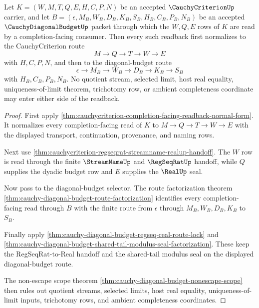 \begin{theorem}
\label{thm:cauchycriterion-diagonal-budget-readback-compatibility}
Let $K=(W,M,T,Q,E,H,C,P,N)$ be an accepted $\CauchyCriterionUp$
carrier, and let
$B=(\epsilon,M_B,W_B,D_B,K_B,S_B,H_B,C_B,P_B,N_B)$ be an accepted
$\CauchyDiagonalBudgetUp$ packet through which the $W,Q,E$ rows of $K$ are
read by a completion-facing consumer. Then every such readback first
normalizes to the CauchyCriterion route
$$
M \to Q \to T \to W \to E
$$
with $H,C,P,N$, and then to the diagonal-budget route
$$
\epsilon \to M_B \to W_B \to D_B \to K_B \to S_B
$$
with $H_B,C_B,P_B,N_B$. No quotient stream, selected limit, host real
equality, uniqueness-of-limit theorem, trichotomy row, or ambient
completeness coordinate may enter either side of the readback.
\end{theorem}
\begin{proof}
First apply
\autoref{thm:cauchycriterion-completion-facing-readback-normal-form}. It
normalizes every completion-facing read of $K$ to
$M \to Q \to T \to W \to E$ with the displayed transport, continuation,
provenance, and naming rows.

Next use
\autoref{thm:cauchycriterion-regseqrat-streamname-realup-handoff}. The
$W$ row is read through the finite $\StreamNameUp$ and $\RegSeqRatUp$
handoff, while $Q$ supplies the dyadic budget row and $E$ supplies the
$\RealUp$ seal.

Now pass to the diagonal-budget selector. The route factorization theorem
\autoref{thm:cauchy-diagonal-budget-route-factorization} identifies every
completion-facing read through $B$ with the finite route from $\epsilon$
through $M_B,W_B,D_B,K_B$ to $S_B$.

Finally apply
\autoref{thm:cauchy-diagonal-budget-regseq-real-route-lock} and
\autoref{thm:cauchy-diagonal-budget-shared-tail-modulus-seal-factorization}.
These keep the RegSeqRat-to-Real handoff and the shared-tail modulus seal on
the displayed diagonal-budget route.

The non-escape scope theorem
\autoref{thm:cauchy-diagonal-budget-nonescape-scope} then rules out
quotient streams, selected limits, host real equality, uniqueness-of-limit
inputs, trichotomy rows, and ambient completeness coordinates.
\end{proof}

